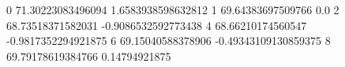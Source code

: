 0 71.30223083496094 1.6583938598632812
1 69.64383697509766 0.0
2 68.73518371582031 -0.9086532592773438
4 68.66210174560547 -0.9817352294921875
6 69.15040588378906 -0.49343109130859375
8 69.79178619384766 0.14794921875
